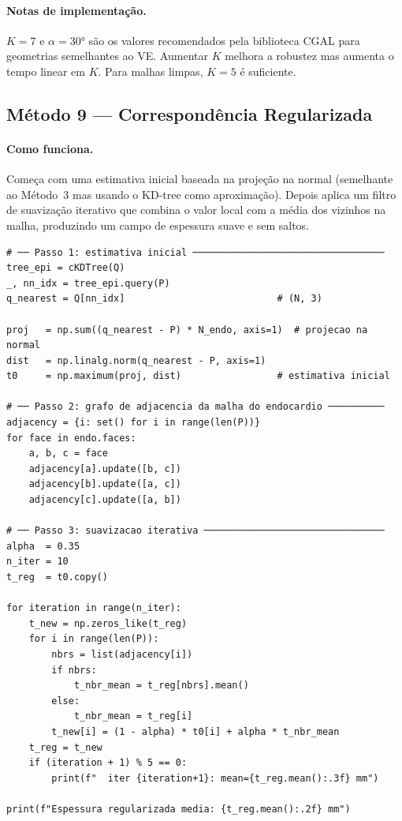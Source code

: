 \paragraph{Notas de implementação.}
$K=7$ e $\alpha=30°$ são os valores recomendados pela biblioteca
CGAL para geometrias semelhantes ao VE. Aumentar $K$ melhora
a robustez mas aumenta o tempo linear em $K$. Para malhas
limpas, $K=5$ é suficiente.

\subsection{Método 9 --- Correspondência Regularizada}
\label{impl:reg}

\paragraph{Como funciona.}
Começa com uma estimativa inicial baseada na projeção na normal
(semelhante ao Método~3 mas usando o KD-tree como aproximação).
Depois aplica um filtro de suavização iterativo que combina o valor
local com a média dos vizinhos na malha, produzindo um campo de
espessura suave e sem saltos.

\begin{lstlisting}
# ── Passo 1: estimativa inicial ──────────────────────────────────
tree_epi = cKDTree(Q)
_, nn_idx = tree_epi.query(P)
q_nearest = Q[nn_idx]                           # (N, 3)

proj   = np.sum((q_nearest - P) * N_endo, axis=1)  # projecao na normal
dist   = np.linalg.norm(q_nearest - P, axis=1)
t0     = np.maximum(proj, dist)                 # estimativa inicial

# ── Passo 2: grafo de adjacencia da malha do endocardio ──────────
adjacency = {i: set() for i in range(len(P))}
for face in endo.faces:
    a, b, c = face
    adjacency[a].update([b, c])
    adjacency[b].update([a, c])
    adjacency[c].update([a, b])

# ── Passo 3: suavizacao iterativa ────────────────────────────────
alpha  = 0.35
n_iter = 10
t_reg  = t0.copy()

for iteration in range(n_iter):
    t_new = np.zeros_like(t_reg)
    for i in range(len(P)):
        nbrs = list(adjacency[i])
        if nbrs:
            t_nbr_mean = t_reg[nbrs].mean()
        else:
            t_nbr_mean = t_reg[i]
        t_new[i] = (1 - alpha) * t0[i] + alpha * t_nbr_mean
    t_reg = t_new
    if (iteration + 1) % 5 == 0:
        print(f"  iter {iteration+1}: mean={t_reg.mean():.3f} mm")

print(f"Espessura regularizada media: {t_reg.mean():.2f} mm")
\end{lstlisting}

